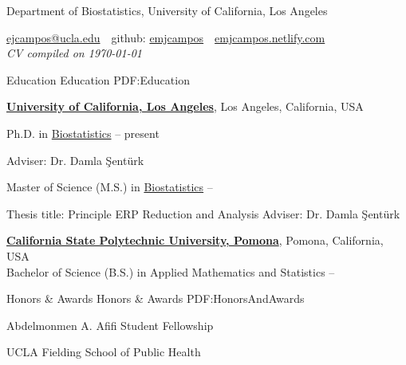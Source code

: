 \documentclass[letterpaper,MMMyyyy,nonstopmode]{simpleresumecv}
\newcommand{\CVAuthor}{Emilie Campos}
\newcommand{\CVNote}{CV compiled on {\today}}
\newcommand{\CVWebpage}{emjcampos.netlify.com}
\begin{document}

\Title{\CVAuthor}

\begin{SubTitle}
{Department of Biostatistics, University of California, Los Angeles}
\par
\href{mailto:ejcampos@ucla.edu}
{ejcampos@ucla.edu}
\,\SubBulletSymbol\,
github: \href{https://github.com/emjcampos}{\url{emjcampos}}
\,\SubBulletSymbol\,
\href{https://emjcampos.netlify.com}
{\url{\CVWebpage}}\\
\textit{\CVNote}
\end{SubTitle}

\begin{Body}


\Section
{Education}
{Education}
{PDF:Education}

\Entry
\href{http://www.example.com/my-university}
{\textbf{University of California, Los Angeles}},
Los Angeles, California, USA

\BigGap
Ph.D. in
\href{http://www.biostat.ucla.edu}
{Biostatistics}
\hfill
{} -- present
\begin{Detail}
\SubBulletItem
Adviser:
Dr. Damla \c{S}ent\"{u}rk
\end{Detail}

\BigGap
Master of Science (M.S.) in
\href{http://www.biostat.ucla.edu}
{Biostatistics}
\hfill
{} --
\begin{Detail}
\SubBulletItem
Thesis title: Principle ERP Reduction and Analysis
\href{http://www.example.com/my-phd-thesis}
{}
\SubBulletItem
Adviser: Dr. Damla \c{S}ent\"{u}rk
\end{Detail}

\BigGap
\Entry
\href{http://www.example.com/my-college}
{\textbf{California State Polytechnic University, Pomona}}, 
Pomona, California, USA \\ 
Bachelor of Science (B.S.) in Applied Mathematics and Statistics
\hfill
{} --


\Section
{Honors \&\newline
Awards}
{Honors \& Awards}
{PDF:HonorsAndAwards}

Abdelmonmen A. Afifi Student Fellowship \hfill {}
\begin{Detail} 
UCLA Fielding School of Public Health 
\end{Detail}
\BigGap


\end{Body}
\end{document}
